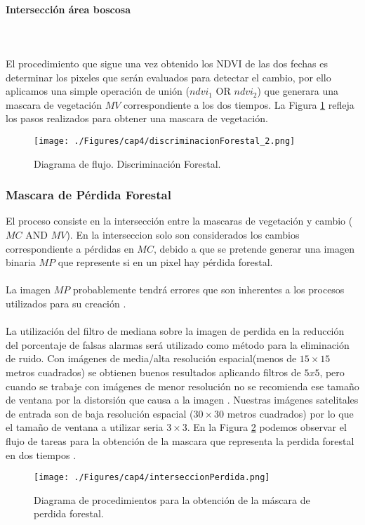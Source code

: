 \paragraph{Intersecci\'on \'area boscosa }\mbox{}\\\mbox{}\\
El procedimiento que sigue una vez obtenido los NDVI de las dos fechas es determinar los pixeles que ser\'an evaluados para detectar el cambio, por ello aplicamos una simple operaci\'on de uni\'on ($ ndvi_{1} $ OR $ ndvi_{2}$) que generara una mascara de vegetaci\'on $ MV $ correspondiente a los dos tiempos. La Figura \ref{fig:discrimForestal} refleja los pasos realizados para obtener una mascara de vegetaci\'on.
\begin{figure}[H]
	\centering
	\texttt{[image: ./Figures/cap4/discriminacionForestal\_2.png]}
	\caption{Diagrama de flujo. Discriminaci\'on Forestal.}
	\label{fig:discrimForestal}
\end{figure}


\subsubsection{Mascara de P\'erdida Forestal}
El proceso consiste en la intersecci\'on entre la mascaras de vegetaci\'on y cambio ($ MC$ AND $MV $). En la interseccion solo son considerados los cambios correspondiente a p\'erdidas en $ MC $, debido a que se pretende generar una imagen binaria $ MP $ que represente si en un pixel hay p\'erdida forestal.\\~\\
La imagen $ MP $ probablemente tendr\'a errores que son inherentes a los procesos utilizados para su creación \cite{lovell2001filtering}. \\~\\
La utilizaci\'on del filtro de mediana sobre la imagen de perdida en la reducci\'on del porcentaje de falsas alarmas ser\'a utilizado como m\'etodo para la eliminaci\'on de ruido. Con im\'agenes de media/alta resoluci\'on espacial(menos de $ 15 \times 15 $ metros cuadrados) se obtienen buenos resultados aplicando filtros de $ 5x5 $, pero cuando se trabaje con im\'agenes de menor resoluci\'on no se recomienda ese tama\~{n}o de ventana por la distorsi\'on que causa a la imagen \cite{martinez2013normalizacion}. Nuestras im\'agenes satelitales de entrada son de baja resoluci\'on espacial ($ 30 \times 30 $ metros cuadrados) por lo que el tama\~{n}o de ventana a utilizar seria $ 3 \times 3 $.
En la Figura \ref{fig:intersPerdida} podemos observar el flujo de tareas para la obtenci\'on de la mascara que representa la perdida forestal en dos tiempos .
\begin{figure}[H]
	\centering
	\texttt{[image: ./Figures/cap4/interseccionPerdida.png]}
	\caption{Diagrama de procedimientos para la obtenci\'on de la m\'ascara de perdida forestal.}
	\label{fig:intersPerdida}
\end{figure}

